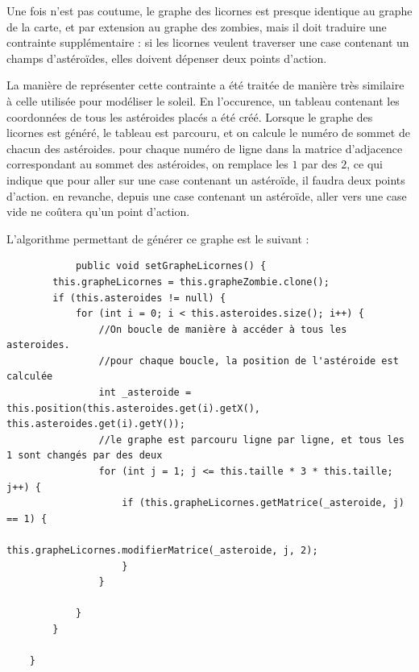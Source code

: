 \documentclass{report}
\begin{document}
			Une fois n'est pas coutume, le graphe des licornes est presque identique au graphe de la carte, et par extension au graphe des zombies, mais il doit traduire une contrainte supplémentaire : si les licornes veulent traverser une case contenant un champs d'astéroïdes, elles doivent dépenser deux points d'action.
			
			La manière de représenter cette contrainte a été traitée de manière très similaire à celle utilisée pour modéliser le soleil. En l'occurence, un tableau contenant les coordonnées de tous les astéroides placés a été créé. Lorsque le graphe des licornes est généré, le tableau est parcouru, et on calcule le numéro de sommet de chacun des astéroides. pour chaque numéro de ligne dans la matrice d'adjacence correspondant au sommet des astéroides, on remplace les $1$ par des $2$, ce qui indique que pour aller sur une case contenant un astéroïde, il faudra deux points d'action. en revanche, depuis une case contenant un astéroïde, aller vers une case vide ne coûtera qu'un point d'action.
			
			L'algorithme permettant de générer ce graphe est le suivant :\\
			\begin{verbatim}
			public void setGrapheLicornes() {
        this.grapheLicornes = this.grapheZombie.clone();
        if (this.asteroides != null) {
            for (int i = 0; i < this.asteroides.size(); i++) {
                //On boucle de manière à accéder à tous les asteroides.
                //pour chaque boucle, la position de l'astéroide est calculée
                int _asteroide = this.position(this.asteroides.get(i).getX(), this.asteroides.get(i).getY());
                //le graphe est parcouru ligne par ligne, et tous les 1 sont changés par des deux
                for (int j = 1; j <= this.taille * 3 * this.taille; j++) {
                    if (this.grapheLicornes.getMatrice(_asteroide, j) == 1) {
                        this.grapheLicornes.modifierMatrice(_asteroide, j, 2);
                    }
                }

            }
        }

    }
			\end{verbatim}
			
\end{document}
